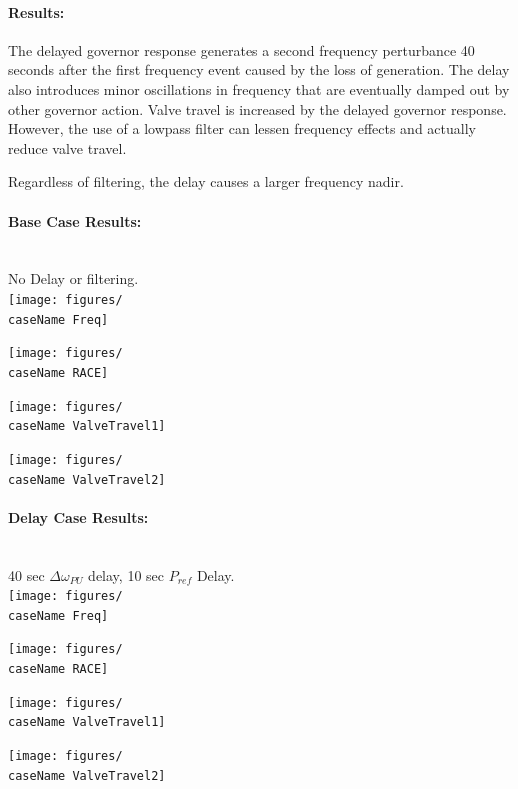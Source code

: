 \documentclass[12pt]{article}
\begin{document}
\paragraph{Results:} The delayed governor response generates a second frequency perturbance 40 seconds after the first frequency event caused by the loss of generation.
The delay also introduces minor oscillations in frequency that are eventually damped out by other governor action.
Valve travel is increased by the delayed governor response.
However, the use of a lowpass filter can lessen frequency effects and actually reduce valve travel.

Regardless of filtering, the delay causes a larger frequency nadir.


\pagebreak

\newcommand{\caseName}{SixMachineDelayStep1}
\paragraph{Base Case Results:} \ \\
No Delay or filtering.
\\
\texttt{[image: figures/\\caseName Freq]}

\texttt{[image: figures/\\caseName RACE]}

\texttt{[image: figures/\\caseName ValveTravel1]}

\texttt{[image: figures/\\caseName ValveTravel2]}

\pagebreak
\renewcommand{\caseName}{SixMachineDelayStep3}
\paragraph{Delay Case Results: } \ \\
40 sec $\Delta \omega_{PU}$ delay, 10 sec $P_{ref}$ Delay.
\\
\texttt{[image: figures/\\caseName Freq]}

\texttt{[image: figures/\\caseName RACE]}

\texttt{[image: figures/\\caseName ValveTravel1]}

\texttt{[image: figures/\\caseName ValveTravel2]}


\pagebreak
\renewcommand{\caseName}{SixMachineDelayStep4}
\end{document}
